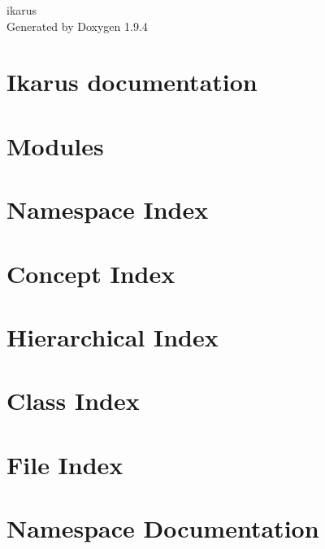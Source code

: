 \documentclass[twoside]{book}
\newcommand{\+}{\discretionary{\mbox{\scriptsize$\hookleftarrow$}}{}{}}
\newcommand{\clearemptydoublepage}{%
    \newpage{\pagestyle{empty}\cleardoublepage}%
  }
\begin{document}
  \raggedbottom
    \hypersetup{pageanchor=false,
                bookmarksnumbered=true,
                pdfencoding=unicode
               }
  \begin{titlepage}
  \vspace*{7cm}
  \begin{center}%
  {\Large ikarus}\\
  \vspace*{1cm}
  {\large Generated by Doxygen 1.9.4}\\
  \end{center}
  \end{titlepage}
  \clearemptydoublepage
  \tableofcontents
  \clearemptydoublepage
  \hypersetup{pageanchor=true}
\chapter{Ikarus documentation}
\label{index}\hypertarget{index}{}
\chapter{Modules}
\label{a02436}

\chapter{Namespace Index}

\chapter{Concept Index}

\chapter{Hierarchical Index}

\chapter{Class Index}

\chapter{File Index}

\chapter{Namespace Documentation}




















\end{document}

